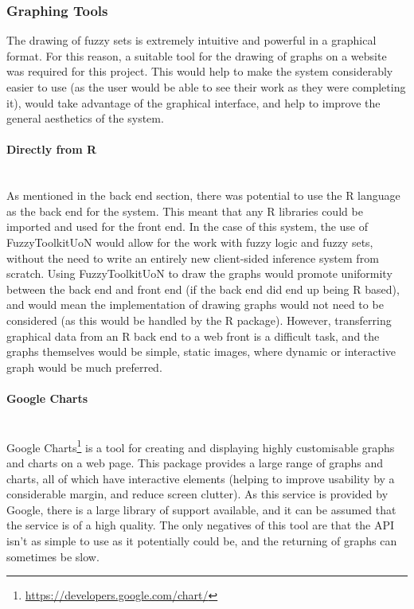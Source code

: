 \subsubsection{Graphing Tools}
The drawing of fuzzy sets is extremely intuitive and powerful in a graphical format. For this reason, a suitable tool for the drawing of graphs on a website was required for this project. This would help to make the system considerably easier to use (as the user would be able to see their work as they were completing it), would take advantage of the graphical interface, and help to improve the general aesthetics of the system. 

\paragraph{Directly from R}\ \\
As mentioned in the back end section, there was potential to use the R language as the back end for the system. This meant that any R libraries could be imported and used for the front end. In the case of this system, the use of FuzzyToolkitUoN would allow for the work with fuzzy logic and fuzzy sets, without the need to write an entirely new client-sided inference system from scratch. Using FuzzyToolkitUoN to draw the graphs would promote uniformity between the back end and front end (if the back end did end up being R based), and would mean the implementation of drawing graphs would not need to be considered (as this would be handled by the R package). However, transferring graphical data from an R back end to a web front is a difficult task, and the graphs themselves would be simple, static images, where dynamic or interactive graph would be much preferred.

\paragraph{Google Charts}\ \\
Google Charts\footnote{\url{https://developers.google.com/chart/}} is a tool for creating and displaying highly customisable graphs and charts on a web page. This package provides a large range of graphs and charts, all of which have interactive elements (helping to improve usability by a considerable margin, and reduce screen clutter). As this service is provided by Google, there is a large library of support available, and it can be assumed that the service is of a high quality. The only negatives of this tool are that the API isn't as simple to use as it potentially could be, and the returning of graphs can sometimes be slow.

